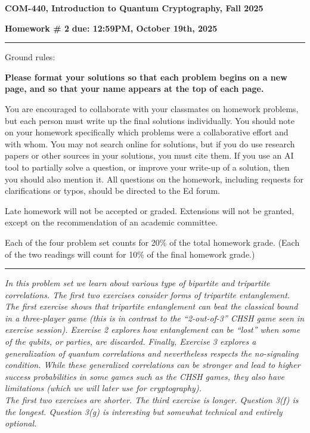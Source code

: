 \documentclass[12pt]{article}
\newcommand{\header}[1]{\begin{center} {\large\bf #1} \end{center}}
\begin{document}
\header{COM-440, Introduction to Quantum Cryptography, Fall 2025}
{\bf Homework \# 2} \hfill {\bf due: 12:59PM, {\color{blue}October 19th}, 2025}


\medskip

\hrule

\medskip 

Ground rules: 

{\bf Please
  format your solutions so that each problem begins on a new page, and
  so that your name appears at the top of each page.}

You are encouraged to collaborate with your classmates on
homework problems, but each person must write up the final solutions
individually. You should note on your homework specifically which
problems were a collaborative effort and with whom. You may not search
online for solutions, but if you do use research papers or other
sources in your solutions, you must cite them. If you use an AI tool to 
partially solve a question, or improve your write-up of a solution, then 
you should also mention it. All questions on the homework, including requests for clarifications or typos, should be directed to the Ed forum.

Late homework will not be accepted or graded. Extensions will not be granted, except on the recommendation of an academic committee. 

Each of the four problem set counts for 20\% of the total homework grade. (Each of the two readings will count for 10\% of the final homework grade.)


\medskip

\hrule

\medskip

\emph{In this problem set we learn about various type of bipartite and tripartite correlations. The first two exercises consider forms of tripartite entanglement. The first exercise shows that tripartite entanglement can beat the classical bound in a three-player game (this is in contrast to the ``2-out-of-3'' CHSH game seen in exercise session). Exercise 2 explores how entanglement can be ``lost'' when some of the qubits, or parties, are discarded. Finally, Exercise 3 explores a generalization of quantum correlations and nevertheless respects the no-signaling condition. While these generalized correlations can be stronger and lead to higher success probabilities in some games such as the CHSH games, they also have limitations (which we will later use for cryptography).\\
The first two exercises are shorter. The third exercise is longer. Question 3(f) is the longest. Question 3(g) is interesting but somewhat technical and entirely optional.}
\end{document}
